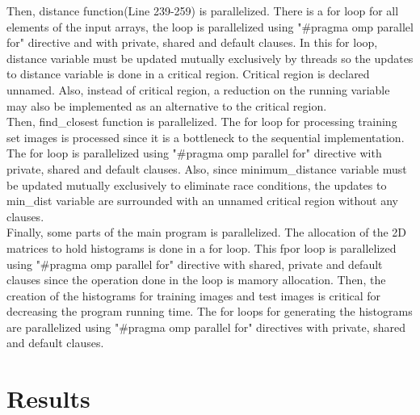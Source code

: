 \documentclass{article}
\begin{document}
\null \qquad Then, distance function(Line 239-259) is parallelized. There is a for loop for all elements of the input arrays, the loop is parallelized using "\#pragma omp parallel for" directive and with private, shared and default clauses. In this for loop, distance variable must be updated mutually exclusively by threads so the updates to distance variable is done in a critical region. Critical region is declared unnamed. Also, instead of critical region, a reduction on the running variable may also be implemented as an alternative to the critical region. \\
\null \qquad Then, find\_closest function is parallelized. The for loop for processing training set images is processed since it is a bottleneck to the sequential implementation. The for loop is parallelized using "#pragma omp parallel for" directive with private, shared and default clauses. Also, since minimum\_distance variable must be updated mutually exclusively to eliminate race conditions, the updates to min\_dist variable are surrounded with an unnamed critical region without any clauses. \\
\null \qquad Finally, some parts of the main program is parallelized. The allocation of the 2D matrices to hold histograms is done in a for loop. This fpor loop is parallelized using "#pragma omp parallel for" directive with shared, private and default clauses since the operation done in the loop is mamory allocation. Then, the creation of the histograms for training images and test images is critical for decreasing the program running time. The for loops for generating the histograms are parallelized using "\#pragma omp parallel for" directives with private, shared and default clauses.

\section{Results}
\end{document}
